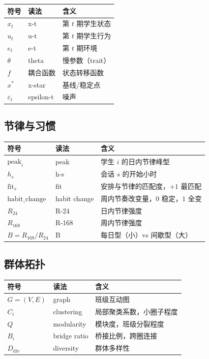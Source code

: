 \documentclass[UTF8,a4paper,11pt]{ctexart}
\begin{document}
\begin{longtable}{@{}p{3.0cm}p{4.8cm}p{6.4cm}@{}}
\toprule
\textbf{符号} & \textbf{读法} & \textbf{含义} \\
\midrule
$x_t$ & x-t & 第 $t$ 期学生状态 \\
$u_t$ & u-t & 第 $t$ 期学生行为 \\
$e_t$ & e-t & 第 $t$ 期环境 \\
$\theta$ & theta & 慢参数（trait） \\
$f$ & 耦合函数 & 状态转移函数 \\
$x^*$ & x-star & 基线/稳定点 \\
$\varepsilon_t$ & epsilon-t & 噪声 \\
\bottomrule
\end{longtable}

\subsection{节律与习惯}

\begin{longtable}{@{}p{3.0cm}p{4.8cm}p{6.4cm}@{}}
\toprule
\textbf{符号} & \textbf{读法} & \textbf{含义} \\
\midrule
$\text{peak}_i$ & peak & 学生 $i$ 的日内节律峰型 \\
$h_s$ & h-s & 会话 $s$ 的开始小时 \\
$\mathrm{fit}_s$ & fit & 安排与节律的匹配度，$+1$ 最匹配 \\
$\text{habit\_change}$ & habit change & 周内节奏改变量，$0$ 稳定，$1$ 全变 \\
$R_{24}$ & R-24 & 日内节律强度 \\
$R_{168}$ & R-168 & 周内节律强度 \\
$B=R_{168}/R_{24}$ & B & 每日型（小）vs 间歇型（大） \\
\bottomrule
\end{longtable}

\subsection{群体拓扑}

\begin{longtable}{@{}p{3.0cm}p{4.8cm}p{6.4cm}@{}}
\toprule
\textbf{符号} & \textbf{读法} & \textbf{含义} \\
\midrule
$G=(V,E)$ & graph & 班级互动图 \\
$C_i$ & clustering & 局部聚类系数，小圈子程度 \\
$Q$ & modularity & 模块度，班级分裂程度 \\
$B_i$ & bridge ratio & 桥接比例，跨圈连接 \\
$D_{\text{div}}$ & diversity & 群体多样性 \\
\bottomrule
\end{longtable}
\end{document}
